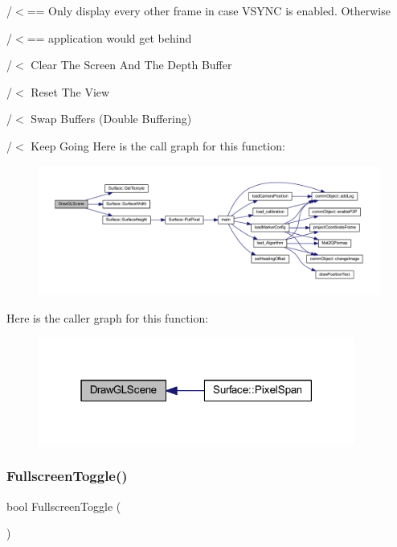 /$<$== Only display every other frame in case V\+S\+Y\+NC is enabled. Otherwise

/$<$== application would get behind

/$<$ Clear The Screen And The Depth Buffer

/$<$ Reset The View

/$<$ Swap Buffers (Double Buffering)

/$<$ Keep Going Here is the call graph for this function\+:\nopagebreak
\begin{figure}[H]
\begin{center}
\leavevmode
\includegraphics[width=350pt]{supportcode_8h_ac43c2dc16b0859b03a4f7d04a7e97d3c_cgraph}
\end{center}
\end{figure}
Here is the caller graph for this function\+:\nopagebreak
\begin{figure}[H]
\begin{center}
\leavevmode
\includegraphics[width=295pt]{supportcode_8h_ac43c2dc16b0859b03a4f7d04a7e97d3c_icgraph}
\end{center}
\end{figure}
\mbox{\label{supportcode_8h_a79e747d7a0c4b5bad264e5a27c00baa5}} 
\subsubsection{Fullscreen\+Toggle()}
{\footnotesize\ttfamily bool Fullscreen\+Toggle (\begin{DoxyParamCaption}{ }\end{DoxyParamCaption})}

